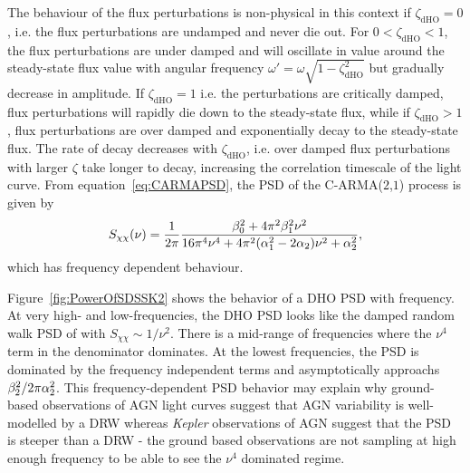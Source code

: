 \documentclass[a4paper,fleqn,usenatbib]{mnras}
\begin{document}
The behaviour of the flux perturbations is non-physical in this context if $\zeta_{\mathrm{dHO}} = 0$, i.e. the flux perturbations are undamped and never die out. For $0 < \zeta_{\mathrm{dHO}} < 1$, the flux perturbations are under damped and will oscillate in value around the steady-state flux value with angular frequency $\omega' = \omega\sqrt{1 - \zeta_{\mathrm{dHO}}^{2}}$ but gradually decrease in amplitude. If $\zeta_{\mathrm{dHO}} = 1$ i.e. the perturbations are critically damped, flux perturbations will rapidly die down to the steady-state flux, while if $\zeta_{\mathrm{dHO}} > 1$, flux perturbations are over damped and exponentially decay to the steady-state flux. The rate of decay decreases with $\zeta_{\mathrm{dHO}}$, i.e. over damped flux perturbations with larger $\zeta$ take longer to decay, increasing the correlation timescale of the light curve. From equation~\eqref{eq:CARMAPSD}, the PSD of the C-ARMA($2$,$1$) process is given by
\begin{equation}\label{eq:CARMA21PSD}
S_{\chi\chi}(\nu) = \frac{1}{2\pi}\frac{\beta_{0}^{2} + 4\pi^{2}\beta_{1}^{2}\nu^{2}}{16\pi^{4}\nu^{4} + 4\pi^{2}(\alpha_{1}^{2}-2\alpha_{2})\nu^{2} + \alpha_{2}^{2}},
\end{equation} 
which has frequency dependent behaviour. 

Figure~\ref{fig:PowerOfSDSSK2} shows the behavior of a DHO PSD with frequency. At very high- and low-frequencies, the DHO PSD looks like the damped random walk PSD of \citet{Kelly09} with $S_{\chi\chi} \sim 1/\nu^{2}$. There is a mid-range of frequencies where the $\nu^{4}$ term in the denominator dominates. At the lowest frequencies, the PSD is dominated by the frequency independent terms and asymptotically approachs $\beta_{2}^{2}/2\pi \alpha_{2}^{2}$. This frequency-dependent PSD behavior may explain why ground-based observations of AGN light curves suggest that AGN variability is well-modelled by a DRW whereas \textit{Kepler} observations of AGN suggest that the PSD is steeper than a DRW - the ground based observations are not sampling at high enough frequency to be able to see the $\nu^{4}$ dominated regime. 
\end{document}
